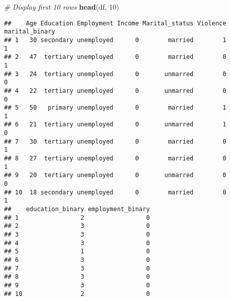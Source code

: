 \documentclass[
]{article}
\newenvironment{Shaded}{\begin{snugshade}}{\end{snugshade}}
\newcommand{\CommentTok}[1]{\textcolor[rgb]{0.56,0.35,0.01}{\textit{#1}}}
\newcommand{\DecValTok}[1]{\textcolor[rgb]{0.00,0.00,0.81}{#1}}
\newcommand{\FunctionTok}[1]{\textcolor[rgb]{0.13,0.29,0.53}{\textbf{#1}}}
\newcommand{\NormalTok}[1]{#1}
\begin{document}
\begin{Shaded}
\begin{Highlighting}[]
\CommentTok{\# Display first 10 rows}
\FunctionTok{head}\NormalTok{(df, }\DecValTok{10}\NormalTok{)}
\end{Highlighting}
\end{Shaded}

\begin{verbatim}
##    Age Education Employment Income Marital_status Violence marital_binary
## 1   30 secondary unemployed      0        married        1              1
## 2   47  tertiary unemployed      0        married        0              1
## 3   24  tertiary unemployed      0       unmarred        0              0
## 4   22  tertiary unemployed      0       unmarred        0              0
## 5   50   primary unemployed      0        married        1              1
## 6   21  tertiary unemployed      0       unmarred        1              0
## 7   30  tertiary unemployed      0        married        0              1
## 8   27  tertiary unemployed      0        married        0              1
## 9   20  tertiary unemployed      0       unmarred        0              0
## 10  18 secondary unemployed      0        married        0              1
##    education_binary employment_binary
## 1                 2                 0
## 2                 3                 0
## 3                 3                 0
## 4                 3                 0
## 5                 1                 0
## 6                 3                 0
## 7                 3                 0
## 8                 3                 0
## 9                 3                 0
## 10                2                 0
\end{verbatim}
\end{document}
